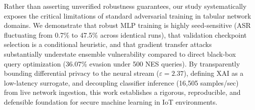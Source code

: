 \documentclass[10pt,journal,compsoc,twocolumn]{IEEEtran}
\begin{document}
Rather than asserting unverified robustness guarantees, our study systematically exposes the critical limitations of standard adversarial training in tabular network domains. We demonstrate that robust MLP training is highly seed-sensitive (ASR fluctuating from 0.7\% to 47.5\% across identical runs), that validation checkpoint selection is a conditional heuristic, and that gradient transfer attacks substantially understate ensemble vulnerability compared to direct black-box query optimization (36.07\% evasion under 500 NES queries). By transparently bounding differential privacy to the neural stream ($\varepsilon=2.37$), defining XAI as a low-latency surrogate, and decoupling classifier inference (16,505 samples/sec) from live network ingestion, this work establishes a rigorous, reproducible, and defensible foundation for secure machine learning in IoT environments.



\end{document}

